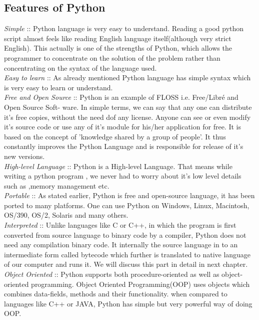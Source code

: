 \subsection{Features of Python}
\textit{Simple}   ::	Python language is very easy to understand. Reading a good python script almost feels like reading English language itself(although very strict English). This actually is one of the strengths of Python, which allows the programmer to concentrate on the solution of the problem rather than concentrating on the syntax of the language used.
\\
\linebreak
\textit{Easy to learn}	::	As already mentioned Python language has simple syntax which is very easy to learn or understand.
\\
\linebreak
\textit{Free and Open Source}	::	Python is an example of FLOSS i.e. Free/Libré and Open Source Soft-
ware. In simple terms, we  can say that any one can distribute it's free copies, without the need dof any license. Anyone can see or even modify it's source code or use any of it's module for his/her application for free. It is based on the concept of 'knowledge shared by a group of people'. It thus constantly improves the Python Language and is responsible for release of it's new versions.
\\
\linebreak
\textit{High-level Language}	::	Python is a High-level Language. That means while writing a python program , we never had to worry about it's low level details such as ,memory management etc. 
\\
\linebreak
\textit{Portable}	::	As stated earlier, Python is free and open-source language, it has been ported to many platforms. One can use Python on Windows, Linux, Macintosh, OS/390, OS/2, Solaris and many others. 
\\
\linebreak
\textit{Interpreted}	::	Unlike languages like C or C++, in which the program is first converted from source language to binary code by a compiler, Python does not need any compilation binary code. It internally the source language in to an intermediate form called bytecode which further is translated to native language of our computer and runs it.
We will discuss this part in detail in next chapter.
\\
\linebreak
\textit{Object Oriented}	::	Python supports both procedure-oriented as well as object-oriented programming. Object Oriented Programming(OOP) uses objects which combines data-fields, methods and their functionality. when compared to languages like C++ or JAVA, Python has simple but very powerful way of doing OOP.
